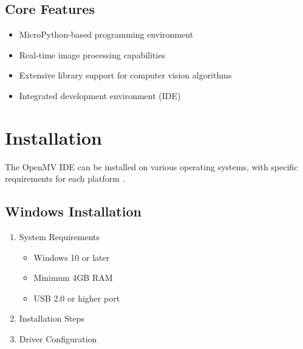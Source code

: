 \subsection{Core Features}

\begin{itemize}
    
    \item MicroPython-based programming environment
    
    \item Real-time image processing capabilities
    
    \item Extensive library support for computer vision algorithms
    
    \item Integrated development environment (IDE)
    
\end{itemize}



\section{Installation}

The OpenMV IDE can be installed on various operating systems, with specific requirements for each platform \cite{openmvgithub:2024,openmv:2024} .



\subsection{Windows Installation}

\begin{enumerate}
    
    \item System Requirements
    
    \begin{itemize}
        
        \item Windows 10 or later
        
        \item Minimum 4GB RAM
        
        \item USB 2.0 or higher port
        
    \end{itemize}
    
    \item Installation Steps
    
    \item Driver Configuration
    
\end{enumerate}



